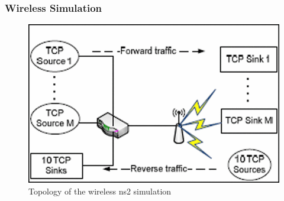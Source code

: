 \documentclass{beamer}
\begin{document}
\begin{frame}
\frametitle{Wireless Simulation}
\begin{figure}
	\includegraphics[height=0.3\textheight]{images/abdeljaouad10_topology_3.png}
	\caption{Topology of the wireless ns2 simulation}
\end{figure}




\end{frame}
\end{document}
